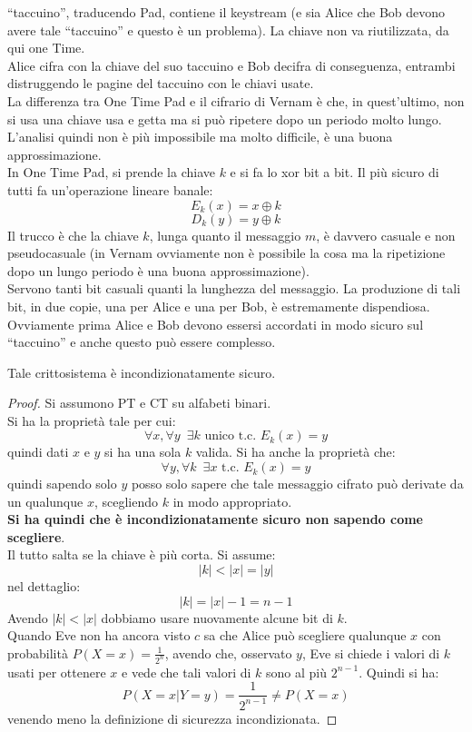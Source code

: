 \documentclass[a4paper,12pt, oneside]{book}
\begin{document}
``taccuino'', traducendo Pad, contiene il keystream (e sia Alice che Bob devono
avere tale ``taccuino'' e questo è un problema). La chiave non va riutilizzata,
da qui one Time.\\
Alice cifra con la chiave del suo taccuino e Bob decifra di conseguenza,
entrambi distruggendo le pagine del taccuino con le chiavi usate.\\
La differenza tra One Time Pad e il cifrario di Vernam è che, in quest'ultimo,
non si usa una chiave usa e getta ma si può ripetere dopo un periodo molto
lungo. L'analisi quindi non è più impossibile ma molto difficile, è una buona
approssimazione. \\
In One Time Pad, si prende la chiave $k$ e si fa lo xor bit a bit. Il più sicuro
di tutti fa un'operazione lineare banale:
\[E_k(x)=x\oplus k\]
\[D_k(y)=y\oplus k\]
Il trucco è che la chiave $k$, lunga quanto il messaggio $m$, è davvero casuale
e non pseudocasuale (in Vernam 
ovviamente non è possibile la cosa ma la ripetizione dopo un lungo periodo è una
buona approssimazione). \\
Servono tanti bit casuali quanti la lunghezza del messaggio. La produzione di
tali bit, in due copie, una per Alice e una per Bob, è estremamente
dispendiosa.\\
Ovviamente prima Alice e Bob devono essersi accordati in modo sicuro sul
``taccuino'' e anche questo può essere complesso. 
\begin{teorema}
  Tale crittosistema è incondizionatamente sicuro.
\end{teorema}
\begin{proof}
  Si assumono PT e CT su alfabeti binari.\\
  Si ha la proprietà tale per cui:
  \[\forall x, \forall y\,\,\, \exists k \mbox{ unico t.c. } E_k(x)=y\]
  quindi dati $x$ e $y$ si ha una sola $k$ valida.
  Si ha anche la proprietà che:
  \[\forall y, \forall k\,\,\, \exists x \mbox{ t.c. } E_k(x)=y\]
  quindi sapendo solo $y$ posso solo sapere che tale messaggio cifrato può
  derivate da un qualunque $x$, scegliendo $k$ in modo appropriato.\\
  \textbf{Si ha quindi che è incondizionatamente sicuro non sapendo come
    scegliere}.\\ 
  Il tutto salta se la chiave è più corta. Si assume:
  \[|k|<|x|=|y|\]
  nel dettaglio:
  \[|k|=|x|-1=n-1\]
  Avendo $|k|<|x|$ dobbiamo usare nuovamente alcune bit di $k$.\\
  Quando Eve non ha ancora visto $c$ sa che Alice può scegliere qualunque $x$
  con probabilità $P(X=x)=\frac{1}{2^n}$, avendo che, osservato $y$, Eve si
  chiede i valori di $k$ usati per ottenere $x$ e vede che tali valori di $k$
  sono al più $2^{n-1}$. Quindi si ha:
  \[P(X=x|Y=y)=\frac{1}{2^{n-1}}\neq P(X=x)\]
  venendo meno la definizione di sicurezza incondizionata.
\end{proof}
\end{document}
